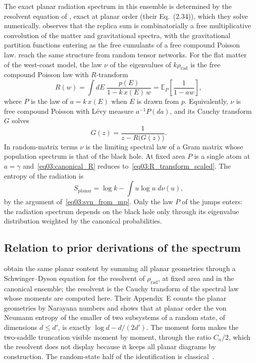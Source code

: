 \documentclass[11pt,letterpaper]{article}
\theoremstyle{plain}
\theoremstyle{definition}
\theoremstyle{remark}
\begin{document}
The exact planar radiation spectrum in this ensemble is determined by the resolvent equation of \citet{pssyetal2022}, exact at planar order (their Eq.~(2.34)), which they solve numerically. \citet{wang2023} observes that the replica sum is combinatorially a free multiplicative convolution of the matter and gravitational spectra, with the gravitational partition functions entering as the free cumulants of a free compound Poisson law. \citet{chengetal2024} reach the same structure from random tensor networks. For the flat matter of the west-coast model, the law $\nu$ of the eigenvalues of $k\rho_{\mathrm{rad}}$ is the free compound Poisson law with $R$-transform
\begin{equation}
\label{eq03:canonical_R}
R(w) = \int dE \; \frac{p(E)}{1 - k\, x(E)\, w} = \mathbb{E}_P\!\left[\frac{1}{1 - a w}\right],
\end{equation}
where $P$ is the law of $a = k\,x(E)$ when $E$ is drawn from $p$. Equivalently, $\nu$ is free compound Poisson with L\'evy measure $a^{-1}P(da)$, and its Cauchy transform $G$ solves
\begin{equation}
\label{eq04:selfconsistent}
G(z) = \frac{1}{z - R\big(G(z)\big)} .
\end{equation}
In random-matrix terms $\nu$ is the limiting spectral law of a Gram matrix whose population spectrum is that of the black hole. At fixed area $P$ is a single atom at $a = \gamma$ and~\eqref{eq03:canonical_R} reduces to~\eqref{eq03:R_transform_scaled}. The entropy of the radiation is
\begin{equation}
\label{eq03:canonical_entropy}
S_{\mathrm{planar}} = \log k - \int u \log u \; d\nu(u),
\end{equation}
by the argument of~\eqref{eq03:svn_from_mp}. Only the law $P$ of the jumps enters: the radiation spectrum depends on the black hole only through its eigenvalue distribution weighted by the canonical probabilities.

\subsection{Relation to prior derivations of the spectrum}
\label{subsec03:positioning}

\citet{pssyetal2022} obtain the same planar content by summing all planar geometries through a Schwinger--Dyson equation for the resolvent of $\rho_{\mathrm{rad}}$, at fixed area and in the canonical ensemble; the resolvent is the Cauchy transform of the spectral law whose moments are computed here. Their Appendix~E counts the planar geometries by Narayana numbers and shows that at planar order the von Neumann entropy of the smaller of two subsystems of a random state, of dimensions $d \le d'$, is exactly $\log d - d/(2d')$. The moment form makes the two-saddle truncation visible moment by moment, through the ratio $C_n/2$, which the resolvent does not display because it keeps all planar diagrams by construction.
 The random-state half of the identification is classical~\citep{lubkin1978, lloydpagels1988, page1993entropy}.
\end{document}
